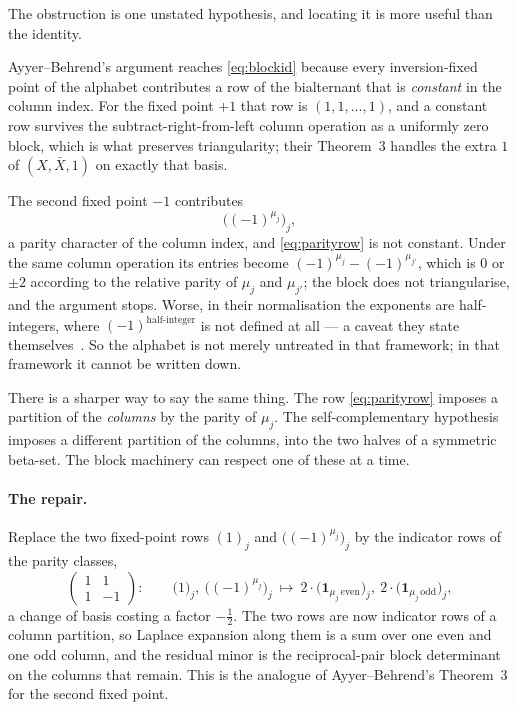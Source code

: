 \documentclass[11pt,a4paper]{article}
\begin{document}
The obstruction is one unstated hypothesis, and locating it is more useful than the identity.

Ayyer--Behrend's argument reaches \eqref{eq:blockid} because every inversion-fixed point of the
alphabet contributes a row of the bialternant that is \emph{constant} in the column index. For
the fixed point $+1$ that row is $(1,1,\dots,1)$, and a constant row survives the
subtract-right-from-left column operation as a uniformly zero block, which is what preserves
triangularity; their Theorem~3 handles the extra $1$ of $(X,\bar X,1)$ on exactly that basis.

The second fixed point $-1$ contributes
\begin{equation}\label{eq:parityrow}
\big((-1)^{\mu_j}\big)_j,
\end{equation}
a parity character of the column index, and \eqref{eq:parityrow} is not constant. Under the
same column operation its entries become $(-1)^{\mu_j}-(-1)^{\mu_{j'}}$, which is $0$ or $\pm2$
according to the relative parity of $\mu_j$ and $\mu_{j'}$; the block does not triangularise,
and the argument stops. Worse, in their normalisation the exponents are half-integers, where
$(-1)^{\text{half-integer}}$ is not defined at all --- a caveat they state
themselves~\cite[p.~3]{AB}. So the alphabet is not merely untreated in that framework; in that
framework it cannot be written down.

There is a sharper way to say the same thing. The row \eqref{eq:parityrow} imposes a partition
of the \emph{columns} by the parity of $\mu_j$. The self-complementary hypothesis imposes a
different partition of the columns, into the two halves of a symmetric beta-set. The block
machinery can respect one of these at a time.

\paragraph{The repair.} Replace the two fixed-point rows $(1)_j$ and $\big((-1)^{\mu_j}\big)_j$
by the indicator rows of the parity classes,
\begin{equation}\label{eq:repair}
\begin{pmatrix}1&1\\1&-1\end{pmatrix}:\qquad
\big(1\big)_j,\ \big((-1)^{\mu_j}\big)_j\ \longmapsto\
2\cdot\big(\mathbf 1_{\mu_j\,\mathrm{even}}\big)_j,\ 2\cdot\big(\mathbf 1_{\mu_j\,\mathrm{odd}}\big)_j,
\end{equation}
a change of basis costing a factor $-\tfrac12$. The two rows are now indicator rows of a column
partition, so Laplace expansion along them is a sum over one even and one odd column, and the
residual minor is the reciprocal-pair block determinant on the columns that remain. This is the
analogue of Ayyer--Behrend's Theorem~3 for the second fixed point.
\end{document}
